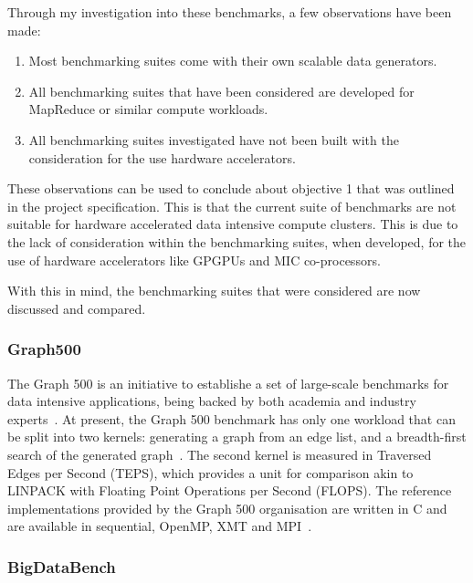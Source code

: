 \documentclass[12pt,a4paper]{article}
\begin{document}
            Through my investigation into these benchmarks, a few observations have been made:
            
            \begin{enumerate}
            \item Most benchmarking suites come with their own scalable data generators.
            \item All benchmarking suites that have been considered are developed for MapReduce or similar compute workloads.
            \item All benchmarking suites investigated have not been built with the consideration for the use hardware accelerators.
            \end{enumerate}
            
            These observations can be used to conclude about objective 1 that was outlined in the project specification. This is that the current suite of benchmarks are not suitable for hardware accelerated data intensive compute clusters. This is due to the lack of consideration within the benchmarking suites, when developed, for the use of hardware accelerators like GPGPUs and MIC co-processors.
            
            With this in mind, the benchmarking suites that were considered are now discussed and compared.
    
            \subsubsection{Graph500}
            \label{ssub:graph500}
            
                The Graph 500 is an initiative to establishe a set of large-scale benchmarks for data intensive applications, being backed by both academia and industry experts~\cite{graph500-intro}. At present, the Graph 500 benchmark has only one workload that can be split into two kernels: generating a graph from an edge list, and a breadth-first search of the generated graph~\cite{graph500-spec}. The second kernel is measured in Traversed Edges per Second (TEPS), which provides a unit for comparison akin to LINPACK with Floating Point Operations per Second (FLOPS). The reference implementations provided by the Graph 500 organisation are written in C and are available in sequential, OpenMP, XMT and MPI~\cite{graph500-reference-impl}.
        
            \subsubsection{BigDataBench}
            \label{ssub:bigdatabench}
\end{document}
